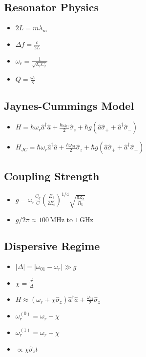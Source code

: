 \documentclass{article}
\begin{document}
\subsection*{Resonator Physics}
\begin{itemize}
    \item $2L = m\lambda_m$
    \item $\Delta f = \frac{c}{2L}$
    \item $\omega_r = \frac{1}{\sqrt{L_r C_r}}$
    \item $Q = \frac{\omega_r}{\kappa}$
\end{itemize}

\subsection*{Jaynes-Cummings Model}
\begin{itemize}
    \item $H = \hbar\omega_r\hat{a}^\dagger\hat{a} + \frac{\hbar\omega_{01}}{2}\hat{\sigma}_z + \hbar g(\hat{a}\hat{\sigma}_+ + \hat{a}^\dagger\hat{\sigma}_-)$
    \item $H_{JC} = \hbar\omega_r\hat{a}^\dagger\hat{a} + \frac{\hbar\omega_{01}}{2}\hat{\sigma}_z + \hbar g(\hat{a}\hat{\sigma}_+ + \hat{a}^\dagger\hat{\sigma}_-)$
\end{itemize}

\subsection*{Coupling Strength}
\begin{itemize}
    \item $g = \omega_r \frac{C_g}{C} \left(\frac{E_j}{2E_c}\right)^{1/4} \sqrt{\frac{\pi Z_r}{R_k}}$
    \item $g/2\pi \approx 100\,\text{MHz} \text{ to } 1\,\text{GHz}$
\end{itemize}

\subsection*{Dispersive Regime}
\begin{itemize}
    \item $|\Delta| = |\omega_{01} - \omega_r| \gg g$
    \item $\chi = \frac{g^2}{\Delta}$
    \item $H \approx (\omega_r + \chi \hat{\sigma}_z) \hat{a}^\dagger \hat{a} + \frac{\omega_{01}}{2} \hat{\sigma}_z$
    \item $\omega_r^{(0)} = \omega_r - \chi$
    \item $\omega_r^{(1)} = \omega_r + \chi$
    \item $\propto \chi \hat{\sigma}_z t$
\end{itemize}
\end{document}
